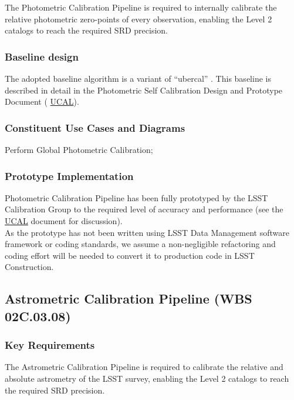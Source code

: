 \documentclass[12pt]{article}
\newcommand{\ds}[2]{{\color{blue} \href{https://docushare.lsstcorp.org/docushare/dsweb/Get/#1}{#2}}\xspace}
\newcommand{\UCAL}{\ds{Document-15125}{UCAL}}
\newcommand{\wbsAstroCal}{WBS 02C.03.08}
\begin{document}
The Photometric Calibration Pipeline is required to internally calibrate the relative photometric zero-points of every observation, enabling the Level 2 catalogs to reach the required SRD precision.

\subsubsection{Baseline design}

The adopted baseline algorithm is a variant of ``ubercal'' \cite{Padmanabhan08, Schlafly12}. This baseline is described in detail in the Photometric Self Calibration Design and Prototype Document (\UCAL).

\subsubsection{Constituent Use Cases and Diagrams}

Perform Global Photometric Calibration;

\subsubsection{Prototype Implementation}

Photometric Calibration Pipeline has been fully prototyped by the LSST Calibration Group to the required level of accuracy and performance (see the \UCAL document for discussion). %
\\

As the prototype has not been written using LSST Data Management software framework or coding standards, we assume a non-negligible refactoring and coding effort will be needed to convert it to production code in LSST Construction.

\clearpage

\subsection{Astrometric Calibration Pipeline (\wbsAstroCal)}

\subsubsection{Key Requirements}

The Astrometric Calibration Pipeline is required to calibrate the relative and absolute astrometry of the LSST survey, enabling the Level 2 catalogs to reach the required SRD precision.
\end{document}
